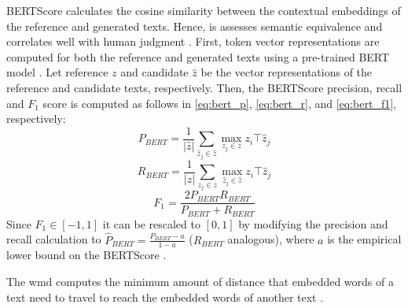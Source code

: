
BERTScore calculates the cosine similarity between the contextual embeddings of the reference and generated texts. 
Hence, is assesses semantic equivalence and correlates well with human judgment \citep{kurt_pehlivanoglu_comparative_2024}.
First, token vector representations are computed for both the reference and generated texts using a pre-trained BERT model \citep{hanna_fine_grained_2021}.
Let reference $z$ and candidate $\hat{z}$ be the vector representations of the reference and candidate texts, respectively.
Then, the BERTScore precision, recall and $F_1$ score is computed as follows in \autoref{eq:bert_p}, \autoref{eq:bert_r}, and \autoref{eq:bert_f1}, respectively:
\begin{equation}
    P_{BERT} = \frac{1}{|\hat{z}|} \sum_{\hat{z}_j \in \hat{z}} \max_{z_j \in z} z_i\top \hat{z}_j
\label{eq:bert_p}
\end{equation}
\begin{equation}
    R_{BERT} = \frac{1}{|z|} \sum_{z_j \in z} \max_{\hat{z}_j \in \hat{z}} z_i\top \hat{z}_j
\label{eq:bert_r}
\end{equation}
\begin{equation}
    F_1 = \frac{2 P_{BERT} R_{BERT}}{P_{BERT} + R_{BERT}} 
\label{eq:bert_f1}
\end{equation}
Since $F_1 \in \left[-1,1\right]$ it can be rescaled to $[0,1]$ by modifying the precision and recall calculation 
to $\hat{P}_{BERT} = \frac{P_{BERT} - a}{1 - a}$ ($R_{BERT}$ analogous), where $a$ is the empirical lower bound on the BERTScore \citep{hanna_fine_grained_2021}.

The \ac{wmd} computes the minimum amount of distance that embedded words of a text need to travel 
to reach the embedded words of another text \citep{gohsen_captions_2023}.


